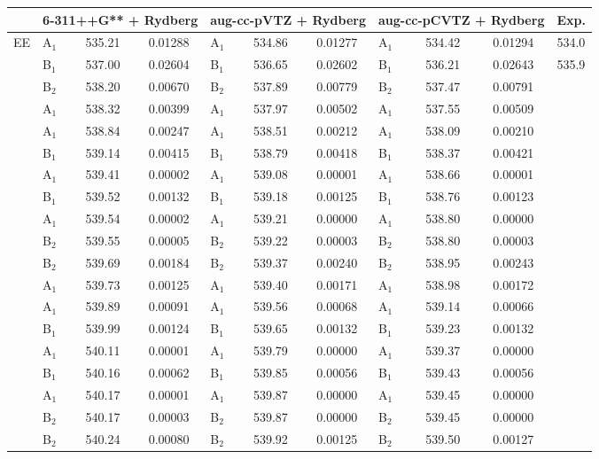 \documentclass[journal=jctcce,manuscript=article]{achemso}
\begin{document}
\begin{table}[H]
\begin{tabular}{l|lcc|lcc|lcc|l}
\cline{2-11}
& \multicolumn{3}{c|}{6-311++G** + Rydberg}
      & \multicolumn{3}{c|}{aug-cc-pVTZ + Rydberg}
      & \multicolumn{3}{c|}{aug-cc-pCVTZ + Rydberg}
      & Exp.\\
\hline
  EE  
& A$_1$ & 535.21 & 0.01288 & A$_1$ & 534.86 & 0.01277 & A$_1$ & 534.42 & 0.01294 & 534.0\cite{NEXAFS_H2O_NH3_CH4_Exp} \\
& B$_1$ & 537.00 & 0.02604 & B$_1$ & 536.65 & 0.02602 & B$_1$ & 536.21 & 0.02643 & 535.9\cite{NEXAFS_H2O_NH3_CH4_Exp} \\
& B$_2$ & 538.20 & 0.00670 & B$_2$ & 537.89 & 0.00779 & B$_2$ & 537.47 & 0.00791 \\
& A$_1$ & 538.32 & 0.00399 & A$_1$ & 537.97 & 0.00502 & A$_1$ & 537.55 & 0.00509 \\
& A$_1$ & 538.84 & 0.00247 & A$_1$ & 538.51 & 0.00212 & A$_1$ & 538.09 & 0.00210 \\
& B$_1$ & 539.14 & 0.00415 & B$_1$ & 538.79 & 0.00418 & B$_1$ & 538.37 & 0.00421 \\
& A$_1$ & 539.41 & 0.00002 & A$_1$ & 539.08 & 0.00001 & A$_1$ & 538.66 & 0.00001 \\
& B$_1$ & 539.52 & 0.00132 & B$_1$ & 539.18 & 0.00125 & B$_1$ & 538.76 & 0.00123 \\
& A$_1$ & 539.54 & 0.00002 & A$_1$ & 539.21 & 0.00000 & A$_1$ & 538.80 & 0.00000 \\
& B$_2$ & 539.55 & 0.00005 & B$_2$ & 539.22 & 0.00003 & B$_2$ & 538.80 & 0.00003 \\
& B$_2$ & 539.69 & 0.00184 & B$_2$ & 539.37 & 0.00240 & B$_2$ & 538.95 & 0.00243 \\
& A$_1$ & 539.73 & 0.00125 & A$_1$ & 539.40 & 0.00171 & A$_1$ & 538.98 & 0.00172 \\
& A$_1$ & 539.89 & 0.00091 & A$_1$ & 539.56 & 0.00068 & A$_1$ & 539.14 & 0.00066 \\
& B$_1$ & 539.99 & 0.00124 & B$_1$ & 539.65 & 0.00132 & B$_1$ & 539.23 & 0.00132 \\
& A$_1$ & 540.11 & 0.00001 & A$_1$ & 539.79 & 0.00000 & A$_1$ & 539.37 & 0.00000 \\
& B$_1$ & 540.16 & 0.00062 & B$_1$ & 539.85 & 0.00056 & B$_1$ & 539.43 & 0.00056 \\
& A$_1$ & 540.17 & 0.00001 & A$_1$ & 539.87 & 0.00000 & A$_1$ & 539.45 & 0.00000 \\
& B$_2$ & 540.17 & 0.00003 & B$_2$ & 539.87 & 0.00000 & B$_2$ & 539.45 & 0.00000 \\
& B$_2$ & 540.24 & 0.00080 & B$_2$ & 539.92 & 0.00125 & B$_2$ & 539.50 & 0.00127 \\

\end{tabular}
\end{table}
\end{document}

